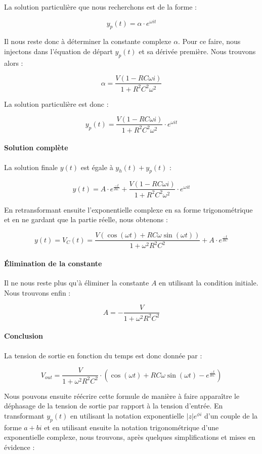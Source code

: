 La solution particulière que nous recherchons est de la forme :

$$y_p(t) = \alpha \cdot e^{\omega i t}$$

Il nous reste donc à déterminer la constante complexe $\alpha$. Pour ce faire,
nous injectons dans l'équation de départ $y_p(t)$ et sa dérivée première. Nous trouvons 
alors :

$$\alpha = \frac{V(1-RC\omega i)}{1+R^2C^2\omega^2}$$

La solution particulière est donc :

$$y_p(t) = \frac{V(1-RC\omega i)}{1+R^2C^2\omega^2} \cdot e^{\omega i t}$$

\paragraph{Solution complète}

La solution finale $y(t)$ est égale à $y_h(t) + y_p(t)$ :

$$y(t) = A \cdot e^{\frac{-t}{RC}} + \frac{V(1-RC\omega i)}{1+R^2C^2\omega^2} \cdot e^{\omega i t}$$

En retransformant ensuite l'exponentielle complexe en sa forme trigonométrique et en ne
gardant que la partie réelle, nous obtenons :

$$y(t) = V_C(t) = \frac{V(\cos (\omega t) + RC\omega \sin (\omega t))}{1 + \omega^2R^2C^2} + A \cdot e^{\frac{-t}{RC}}$$

\paragraph{Élimination de la constante}

Il ne nous reste plus qu'à éliminer la constante $A$ en utilisant la condition initiale.
Nous trouvons enfin :

$$A = -\frac{V}{1 + \omega^2R^2C^2}$$                         

\paragraph{Conclusion}

La tension de sortie en fonction du temps est donc donnée par :

$$V_{out} = \frac{V}{1 + \omega^2R^2C^2} \cdot (\cos (\omega t) + RC\omega \sin (\omega t) - e^{\frac{-t}{RC}})$$

Nous pouvons ensuite réécrire cette formule de manière à faire apparaître
le déphasage de la tension de sortie par rapport à la tension d'entrée. En transformant
$y_p(t)$ en utilisant la notation exponentielle $|z|e^{\phi i}$ d'un couple de la forme 
$a+bi$ et en utilisant ensuite la notation trigonométrique d'une exponentielle complexe,
nous trouvons, après quelques simplifications et mises en évidence :

